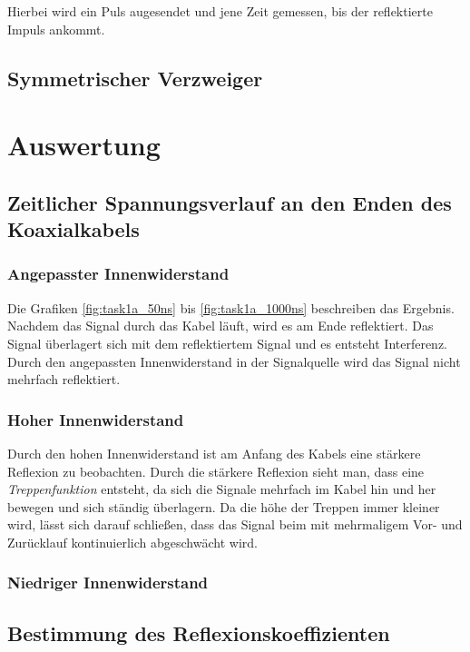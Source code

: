 \documentclass{article}
\begin{document}
Hierbei wird ein Puls augesendet und jene Zeit gemessen, bis der reflektierte Impuls ankommt.


\subsection{Symmetrischer Verzweiger}


\section{Auswertung}

\subsection{Zeitlicher Spannungsverlauf an den Enden des Koaxialkabels}

\subsubsection{Angepasster Innenwiderstand}
Die Grafiken \ref{fig:task1a_50ns} bis \ref{fig:task1a_1000ns} beschreiben das Ergebnis. Nachdem das Signal durch das Kabel läuft, wird es am Ende reflektiert. Das Signal überlagert sich mit dem reflektiertem Signal und es entsteht Interferenz. Durch den angepassten Innenwiderstand in der Signalquelle wird das Signal nicht mehrfach reflektiert. 



\subsubsection{Hoher Innenwiderstand}

Durch den hohen Innenwiderstand ist am Anfang des Kabels eine stärkere Reflexion zu beobachten. Durch die stärkere Reflexion sieht man, dass eine \textit{Treppenfunktion} entsteht, da sich die Signale mehrfach im Kabel hin und her bewegen und sich ständig überlagern. Da die höhe der Treppen immer kleiner wird, lässt sich darauf schließen, dass das Signal beim mit mehrmaligem Vor- und Zurücklauf kontinuierlich abgeschwächt wird.

\subsubsection{Niedriger Innenwiderstand}



\subsection{Bestimmung des Reflexionskoeffizienten}
\end{document}
